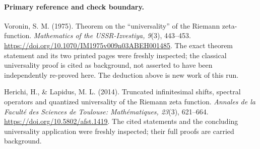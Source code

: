 \paragraph{Primary reference and check boundary.}
Voronin, S. M. (1975). Theorem on the ``universality'' of the
Riemann zeta-function. \emph{Mathematics of the USSR-Izvestiya,
9}(3), 443--453.
\url{https://doi.org/10.1070/IM1975v009n03ABEH001485}.
The exact theorem statement and its two printed pages were
freshly inspected; the classical universality proof is cited
as background, not asserted to have been independently
re-proved here. The deduction above is new work of this run.

Herichi, H., \& Lapidus, M. L. (2014). Truncated infinitesimal
shifts, spectral operators and quantized universality of the
Riemann zeta function. \emph{Annales de la Facult\'e des Sciences
de Toulouse: Math\'ematiques, 23}(3), 621--664.
\url{https://doi.org/10.5802/afst.1419}.
The cited statements and the concluding universality application
were freshly inspected; their full proofs are carried background.
